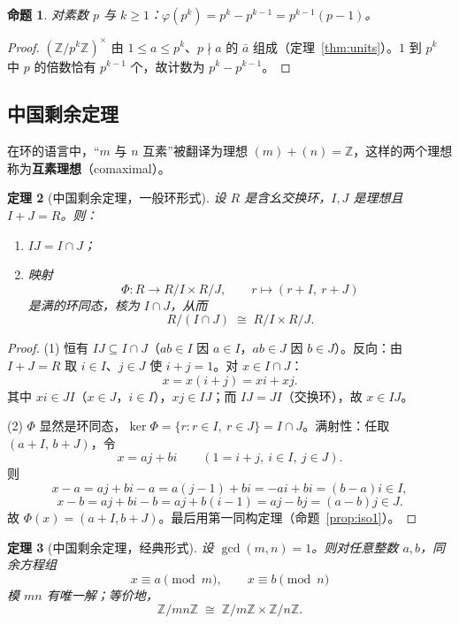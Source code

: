 \documentclass[a4paper,11pt]{ctexart}
\numberwithin{equation}{section}
\theoremstyle{plain}
\newtheorem{theorem}{定理}[section]
\newtheorem{proposition}[theorem]{命题}
\theoremstyle{definition}
\theoremstyle{remark}
\newcommand{\Z}{\mathbb{Z}}
\begin{document}
\begin{proposition}\label{prop:phipk}
对素数 $p$ 与 $k\ge1$：$\varphi(p^k)=p^k-p^{k-1}=p^{k-1}(p-1)$。
\end{proposition}

\begin{proof}
$(\Z/p^k\Z)^{\times}$ 由 $1\le a\le p^k$、$p\nmid a$ 的 $\bar a$ 组成（定理~\ref{thm:units}）。$1$ 到 $p^k$ 中 $p$ 的倍数恰有 $p^{k-1}$ 个，故计数为 $p^k-p^{k-1}$。
\end{proof}

\subsection{中国剩余定理}

在环的语言中，“$m$ 与 $n$ 互素”被翻译为理想 $(m)+(n)=\Z$，这样的两个理想称为\textbf{互素理想}（comaximal）。

\begin{theorem}[中国剩余定理，一般环形式]\label{thm:CRT}
设 $R$ 是含幺交换环，$I,J$ 是理想且 $I+J=R$。则：
\begin{enumerate}[itemsep=0.1em]
  \item $IJ=I\cap J$；
  \item 映射
  \[
  \Phi\colon R\longrightarrow R/I\times R/J,\qquad r\mapsto(r+I,\ r+J)
  \]
  是满的环同态，核为 $I\cap J$，从而
  \[
  R/(I\cap J)\;\cong\; R/I\times R/J .
  \]
\end{enumerate}
\end{theorem}

\begin{proof}
(1) 恒有 $IJ\subseteq I\cap J$（$ab\in I$ 因 $a\in I$，$ab\in J$ 因 $b\in J$）。反向：由 $I+J=R$ 取 $i\in I$、$j\in J$ 使 $i+j=1$。对 $x\in I\cap J$：
\[
x=x(i+j)=xi+xj .
\]
其中 $xi\in JI$（$x\in J$，$i\in I$），$xj\in IJ$；而 $IJ=JI$（交换环），故 $x\in IJ$。

(2) $\Phi$ 显然是环同态，$\ker\Phi=\{r: r\in I,\ r\in J\}=I\cap J$。满射性：任取 $(a+I,\,b+J)$，令
\[
x=aj+bi \qquad (1=i+j,\ i\in I,\ j\in J).
\]
则
\[
x-a=aj+bi-a=a(j-1)+bi=-ai+bi=(b-a)i\in I,
\]
\[
x-b=aj+bi-b=aj+b(i-1)=aj-bj=(a-b)j\in J.
\]
故 $\Phi(x)=(a+I,b+J)$。最后用第一同构定理（命题~\ref{prop:iso1}）。
\end{proof}

\begin{theorem}[中国剩余定理，经典形式]\label{thm:CRTZ}
设 $\gcd(m,n)=1$。则对任意整数 $a,b$，同余方程组
\[
x\equiv a \pmod m,\qquad x\equiv b \pmod n
\]
模 $mn$ 有唯一解；等价地，
\[
\Z/mn\Z\;\cong\;\Z/m\Z\times\Z/n\Z .
\]
\end{theorem}
\end{document}
